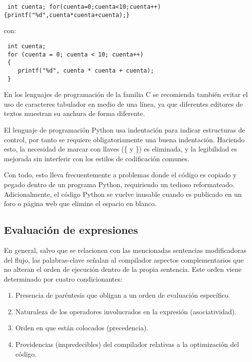 \documentclass[11pt]{article}
\begin{document}
\begin{verbatim}
 int cuenta; for(cuenta=0;cuenta<10;cuenta++)
{printf("%d",cuenta*cuenta+cuenta);}
\end{verbatim}
con:
\begin{verbatim}
 int cuenta;
 for (cuenta = 0; cuenta < 10; cuenta++)
 {
    printf("%d", cuenta * cuenta + cuenta);
 }
\end{verbatim}

En los lenguajes de programación de la familia C se recomienda también
evitar el uso de caracteres tabulador en medio de una línea, ya que
diferentes editores de textos muestran su anchura de forma diferente.

El lenguaje de programación Python usa indentación para indicar
estructuras de control, por tanto se requiere obligatoriamente una
buena indentación. Haciendo esto, la necesidad de marcar con llaves (\{
y \}) es eliminada, y la legibilidad es mejorada sin interferir con los
estilos de codificación comunes.


Con todo, esto lleva frecuentemente a problemas donde el código es
copiado y pegado dentro de un programa Python, requiriendo un
tedioso reformateado. Adicionalmente, el código Python se vuelve
inusable cuando es publicado en un foro o página web que elimine el
espacio en blanco.

\subsection*{Evaluación de expresiones}
\label{sec:orga1a7dbc}

En general, salvo que se relacionen con las mencionadas sentencias modificadoras del 
flujo, las palabras-clave señalan al compilador aspectos complementarios que no
alteran el orden de ejecución dentro de la propia sentencia. Este orden viene 
determinado por cuatro condicionantes:

\begin{enumerate}
\item Presencia de paréntesis que obligan a un orden de evaluación
específico.
\item Naturaleza de los operadores involucrados en la expresión
(asociatividad).
\item Orden en que están colocados (precedencia).
\item Providencias (impredecibles) del compilador relativas a la
optimización del código.
\end{enumerate}
\end{document}
